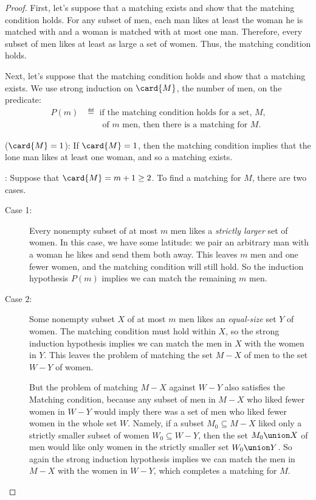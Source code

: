 \begin{proof}
  First, let's suppose that a matching exists and show that the matching
  condition holds.  For any subset of men, each man likes at least the
  woman he is matched with and a woman is matched with at most one man.
  Therefore, every subset of men likes at least as large a set of women.
  Thus, the matching condition holds.

Next, let's suppose that the matching condition holds and show that a
matching exists.  We use strong induction on $\card{M}$, the number of
men, on the predicate:
\begin{align*}
    P(m) & \eqdef \text{ if the matching condition holds for a set,~$M$,}\\
         &\qquad  \text{of~$m$ men, then there is a matching for~$M$.}
\end{align*}

 ($\card{M}=1$): If $\card{M} = 1$, then the
matching condition implies that the lone man likes at least one woman,
and so a matching exists.

: \iffalse
We need to show that $\forall k \le m.\, P(k) \QIMPLIES
P(m + 1)$.\fi  Suppose that $\card{M} = m + 1 \ge 2$.  To find a
matching for $M$, there are two cases.
\begin{description}

\item[Case 1:] Every nonempty subset of at most $m$ men likes a
  \emph{strictly larger} set of women.  In this case, we have some
  latitude: we pair an arbitrary man with a woman he likes and send
  them both away.  This leaves $m$ men and one fewer women, and the
  matching condition will still hold.  So the induction hypothesis
  $P(m)$ implies we can match the remaining $m$ men.

\item[Case 2:] Some nonempty subset $X$ of at most $m$ men likes an
  \emph{equal-size} set $Y$ of women.  The matching condition must
  hold within $X$, so the strong induction hypothesis implies we can
  match the men in $X$ with the women in $Y$.  This leaves the problem
  of matching the set $M-X$ of men to the set $W-Y$ of women.

  But the problem of matching $M-X$ against $W-Y$ also satisfies the
  Matching condition, because any subset of men in $M-X$ who liked
  fewer women in $W-Y$ would imply there was a set of men who liked
  fewer women in the whole set $W$.  Namely, if a subset
  $M_0 \subseteq M-X$ liked only a strictly smaller subset of women
  $W_0 \subseteq W-Y$, then the set $M_0 \union X$ of men would like
  only women in the strictly smaller set $W_0 \union Y$.  So again the
  strong induction hypothesis implies we can match the men in $M-X$
  with the women in $W-Y$, which completes a matching for $M$.
  

\end{description}
\end{proof}
